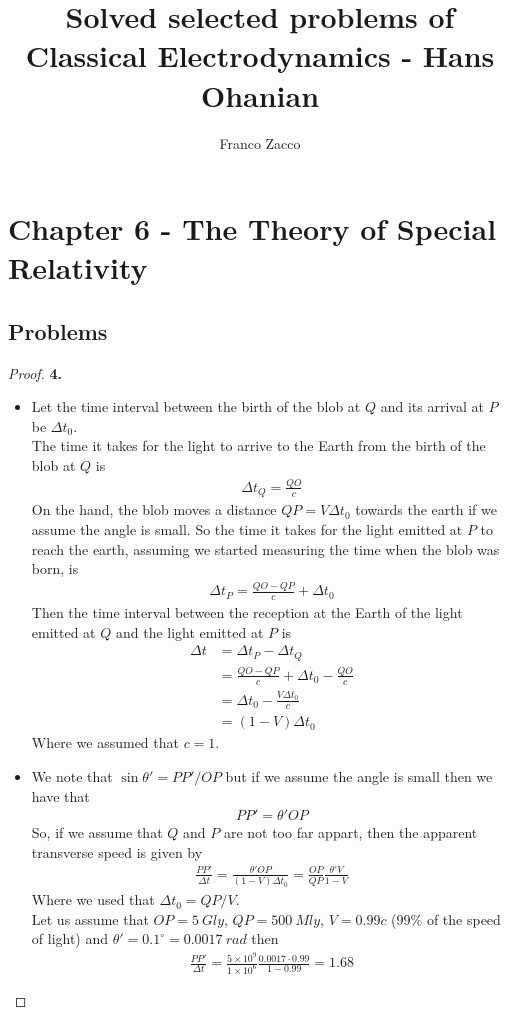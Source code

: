 \documentclass[11pt]{article}
\title{\textbf{Solved selected problems of Classical Electrodynamics - Hans Ohanian}}
\author{Franco Zacco}
\date{}
\newcommand{\sci}[1]{\times 10^{#1}}
\theoremstyle{definition}
\begin{document}
\maketitle
\thispagestyle{empty}

\section*{Chapter 6 - The Theory of Special Relativity}

\subsection*{Problems}
\begin{proof}{\textbf{4.}}
\begin{itemize}
\item [(a)] Let the time interval between the birth of the blob at $Q$ and its
arrival at $P$ be $\Delta t_0$.\\
The time it takes for the light to arrive to the Earth from the birth of the
blob at $Q$ is
\begin{align*}
    \Delta t_{Q} = \frac{QO}{c}
\end{align*}
On the hand, the blob moves a distance $QP = V \Delta t_0$ towards the earth 
if we assume the angle is small.
So the time it takes for the light emitted at $P$ to reach the earth, assuming
we started measuring the time when the blob was born, is
\begin{align*}
    \Delta t_{P} = \frac{QO - QP}{c} + \Delta t_0
\end{align*}
Then the time interval between the reception at the Earth of the light emitted
at $Q$ and the light emitted at $P$ is
\begin{align*}
    \Delta t &= \Delta t_{P} - \Delta t_{Q} \\
    &= \frac{QO - QP}{c} + \Delta t_0 - \frac{QO}{c}\\
    &= \Delta t_0 -\frac{V\Delta t_0}{c}\\
    &= (1 - V)\Delta t_0
\end{align*}
Where we assumed that $c = 1$.

\cleardoublepage
\item [(b)] We note that $\sin \theta' = PP' / OP$ but if we assume the angle
is small then we have that
\begin{align*}
    PP' = \theta' OP
\end{align*}
So, if we assume that $Q$ and $P$ are not too far appart, then the apparent
transverse speed is given by
\begin{align*}
    \frac{PP'}{\Delta t} = \frac{\theta' OP}{(1 - V)\Delta t_0}
    = \frac{OP}{QP}\frac{\theta' V}{1 - V}
\end{align*}
Where we used that $\Delta t_0 = QP / V$.\\
Let us assume that $OP = 5~Gly$, $QP = 500~Mly$, $V = 0.99 c$
($99\%$ of the speed of light) and $\theta'= 0.1^\circ = 0.0017~rad$ then
\begin{align*}
    \frac{PP'}{\Delta t} = \frac{5\sci{9}}{1\sci{6}}\frac{0.0017\cdot0.99}{1 - 0.99}
    = 1.68 
\end{align*}
\end{itemize}
\end{proof}
\end{document}
